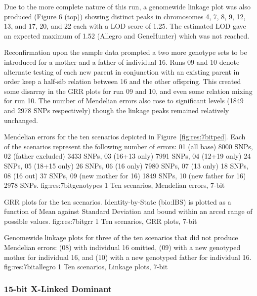 Due to the more complete nature of this run, a genomewide linkage plot was also produced (Figure 6 (top)) showing distinct peaks in chromosomes 4, 7, 8, 9, 12, 13, and 17, 20, and 22 each with a LOD score of 1.25. The estimated LOD gave an expected maximum of 1.52 (Allegro and GeneHunter) which was not reached.

Reconfirmation upon the sample data prompted a two more genotype sets to be introduced for a mother and a father of individual 16. Runs 09 and 10 denote alternate testing of each new parent in conjunction with an existing parent in order keep a half-sib relation between 16 and the other offspring.
This created some disarray in the GRR plots for run 09 and 10, and even some relation mixing for run 10. The number of Mendelian errors also rose to significant levels (1849 and 2978 SNPs respectively) though the linkage peaks remained relatively unchanged.

{Mendelian errors for the ten scenarios depicted in Figure~\ref{fig:res:7bitped}. Each of the scenarios represent the following number of errors: 01 (all base) 8000 SNPs, 02 (father excluded) 3433 SNPs, 03 (16+13 only) 7991 SNPs, 04 (12+19 only) 24 SNPs, 05 (18+15 only) 26 SNPs, 06 (16 only) 7980 SNPs, 07 (13 only) 18 SNPs, 08 (16 out) 37 SNPs, 09 (new mother for 16) 1849 SNPs, 10 (new father for 16) 2978 SNPs.}
{fig:res:7bitgenotypes}
{1}
{Ten scenarios, Mendelian errors, 7-bit}

{GRR plots for the ten scenarios. Identity-by-State (\gls{bio:IBS}) is plotted as a function of Mean against Standard Deviation and bound within an arced range of possible values.}
{fig:res:7bitgrr}
{1}
{Ten scenarios, GRR plots, 7-bit}

{Genomewide linkage plots for three of the ten scenarios that did not produce Mendelian errors: (08) with individual 16 omitted, (09) with a new genotyped mother for individual 16, and (10) with a new genotyped father for individual 16.}
{fig:res:7bitallegro}
{1}
{Ten scenarios, Linkage plots, 7-bit}


\subsubsection*{15-bit X-Linked Dominant}

